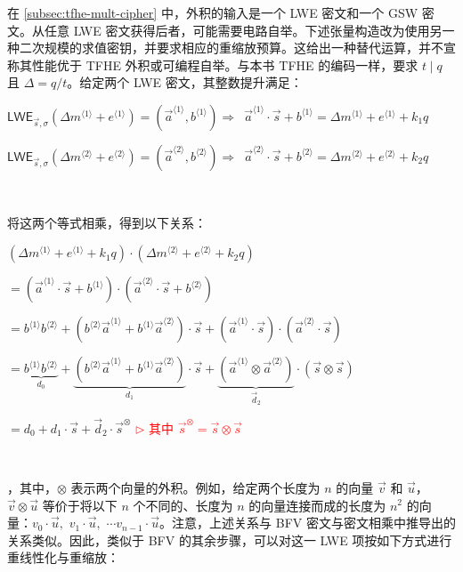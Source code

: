 在 \autoref{subsec:tfhe-mult-cipher} 中，外积的输入是一个 LWE 密文和一个 GSW 密文。从任意 LWE 密文获得后者，可能需要电路自举。下述张量构造改为使用另一种二次规模的求值密钥，并要求相应的重缩放预算。这给出一种替代运算，并不宣称其性能优于 TFHE 外积或可编程自举。与本书 TFHE 的编码一样，要求 $t\mid q$ 且 $\Delta=q/t$。给定两个 LWE 密文，其整数提升满足：

$\textsf{LWE}_{\vec{s}, \sigma}(\Delta m^{\langle 1 \rangle} + e^{\langle 1 \rangle}) = (\vec{a}^{\langle 1 \rangle}, b^{\langle 1 \rangle }) \Rightarrow \,\,\, \vec{a}^{\langle 1 \rangle} \cdot \vec{s} + b^{\langle 1 \rangle} = \Delta m^{\langle 1 \rangle} + e^{\langle 1 \rangle} + k_1q$

$\textsf{LWE}_{\vec{s}, \sigma}(\Delta m^{\langle 2 \rangle} + e^{\langle 2 \rangle})  = (\vec{a}^{\langle 2 \rangle}, b^{\langle 2 \rangle}) \Rightarrow \,\,\, \vec{a}^{\langle 2 \rangle} \cdot \vec{s} + b^{\langle 2 \rangle} = \Delta m^{\langle 2 \rangle} + e^{\langle 2 \rangle} + k_2q$

$ $

将这两个等式相乘，得到以下关系：


$(\Delta m^{\langle 1 \rangle} + e^{\langle 1 \rangle} + k_1q) \cdot (\Delta m^{\langle 2 \rangle} + e^{\langle 2 \rangle} + k_2q)$

$ = (\vec{a}^{\langle 1 \rangle} \cdot \vec{s} + b^{\langle 1 \rangle}) \cdot (\vec{a}^{\langle 2 \rangle} \cdot \vec{s} + b^{\langle 2 \rangle})$ 

$ = b^{\langle 1 \rangle}b^{\langle 2 \rangle}  + (b^{\langle 2 \rangle}\vec{a}^{\langle 1 \rangle} + b^{\langle 1 \rangle}\vec{a}^{\langle 2 \rangle}) \cdot \vec{s} + (\vec{a}^{\langle 1 \rangle} \cdot \vec{s}) \cdot (\vec{a}^{\langle 2 \rangle} \cdot \vec{s}) $



$ = \underbrace{b^{\langle 1 \rangle}b^{\langle 2 \rangle}}_{d_0}  + \underbrace{(b^{\langle 2 \rangle}\vec{a}^{\langle 1 \rangle} + b^{\langle 1 \rangle}\vec{a}^{\langle 2 \rangle})}_{d_1} \cdot \vec{s} + \underbrace{(\vec{a}^{\langle 1 \rangle} \otimes \vec{a}^{\langle 2 \rangle})}_{\vec{d}_2} \cdot (\vec{s} \otimes \vec{s}) $  


$= d_0 + d_1\cdot \vec{s} + \vec{d}_2\cdot \vec{s}^{\otimes}$ \textcolor{red}{ $\rhd$ 其中 $\vec{s}^{\otimes} = \vec{s} \otimes \vec{s}$}

$ $

，其中，$\otimes$ 表示两个向量的外积。例如，给定两个长度为 $n$ 的向量 $\vec{v}$ 和 $\vec{u}$，$\vec{v} \otimes \vec{u}$ 等价于将以下 $n$ 个不同的、长度为 $n$ 的向量连接而成的长度为 $n^2$ 的向量：$v_0\cdot\vec{u}, \,\, v_1\cdot\vec{u}, \,\, \cdots v_{n-1}\cdot\vec{u}$。注意，上述关系与 BFV 密文与密文相乘中推导出的关系类似。因此，类似于 BFV 的其余步骤，可以对这一 LWE 项按如下方式进行重线性化与重缩放：


